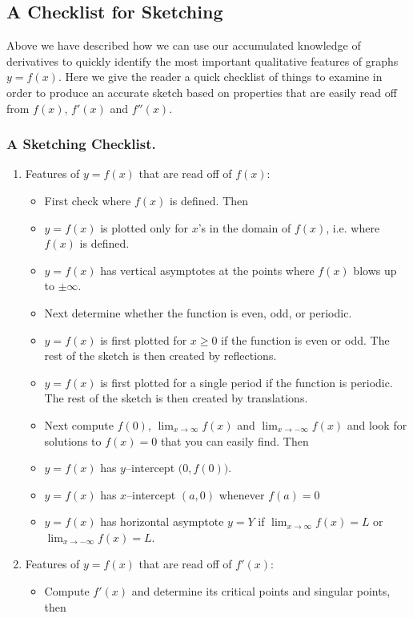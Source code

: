 \subsection{A Checklist for Sketching}\label{ssec_sketch_check}
Above we have described how we can use our accumulated knowledge of derivatives
to quickly identify the most important qualitative features of
graphs $y=f(x)$. Here we give the reader a quick checklist of things to examine
in order to produce an accurate sketch based on properties that are easily read
off from $f(x)$, $f'(x)$ and $f''(x)$.


\subsubsection{A Sketching Checklist.}
\begin{enumerate}[(1)]
\item Features of $y = f(x)$ that are read off of $f(x)$:
\begin{itemize}
 \item First check where $f(x)$ is defined. Then
\item $y=f(x)$ is plotted only for $x$'s in the domain of $f(x)$, i.e. where
$f(x)$ is defined.
\item $y = f(x)$ has vertical asymptotes at the points where $f(x)$ blows up to
$\pm\infty$.
\item Next determine whether the function is even, odd, or periodic.
\item $y=f(x)$ is first plotted for $x\ge 0$ if the function is even or odd. The
rest of the sketch is then created by reflections.
\item $y=f(x)$ is first plotted for a single period if the function is periodic.
The rest of the sketch is then created by translations.
\item Next compute $f(0)$, $\lim_{x\rightarrow\infty} f(x)$ and
$\lim_{x\rightarrow-\infty} f(x)$ and look for solutions to $f(x)=0$ that you
can easily find. Then
\item $y = f(x)$ has $y$--intercept $\big(0, f(0)\big)$.
\item $y = f(x)$ has $x$--intercept $(a,0)$ whenever $f(a)=0$
\item $y = f(x)$ has horizontal asymptote $y=Y$ if $\lim_{x\rightarrow\infty}
f(x)=L$ or $\lim_{x\rightarrow-\infty} f(x)=L$.
\end{itemize}

\item Features of $y=f(x)$ that are read off of $f'(x)$:
\begin{itemize}
\item Compute $f'(x)$ and determine its critical points and singular points, then


\end{itemize}
\end{enumerate}
